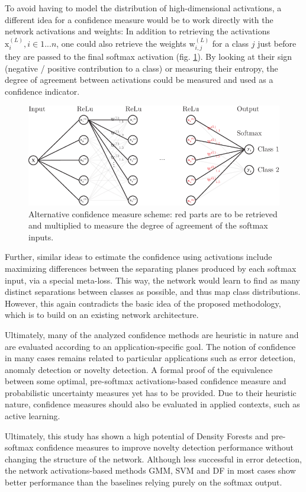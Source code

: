 \documentclass[10pt]{article}
\begin{document}
To avoid having to model the distribution of high-dimensional activations, a different idea for a confidence measure would be to work directly with the network activations and weights: In addition to retrieving the activations $\text{x}^{(L)}_i, i \in 1...n$, one could also retrieve the weights $\text{w}^{(L)}_{i, j}$ for a class $j$ just before they are passed to the final softmax activation (fig. \ref{fig:nn_scheme}). By looking at their sign (negative / positive contribution to a class) or measuring their entropy, the degree of agreement between activations could be measured and used as a confidence indicator.
\begin{figure}[H]
	\centering
	\includegraphics[width=.7\textwidth]{nn_scheme}
	\caption{Alternative confidence measure scheme: red parts are to be retrieved and multiplied to measure the degree of agreement of the softmax inputs.}
	\label{fig:nn_scheme}
\end{figure}

Further, similar ideas to estimate the confidence using activations include maximizing differences between the separating planes produced by each softmax input, via a special meta-loss. This way, the network would learn to find as many distinct separations between classes as possible, and thus map class distributions. However, this again contradicts the basic idea of the proposed methodology, which is to build on an existing network architecture.

Ultimately, many of the analyzed confidence methods are heuristic in nature and are evaluated according to an application-specific goal. The notion of confidence in many cases remains related to particular applications such as error detection, anomaly detection or novelty detection. A formal proof of the equivalence between some optimal, pre-softmax activations-based confidence measure and probabilistic uncertainty measures yet has to be provided. Due to their heuristic nature, confidence measures should also be evaluated in applied contexts, such as active learning.

Ultimately, this study has shown a high potential of Density Forests and pre-softmax confidence measures to improve novelty detection performance without changing the structure of the network. Although less successful in error detection, the network activations-based methods \gls{GMM}, SVM and \gls{DF} in most cases show better performance than the baselines relying purely on the softmax output. 
\end{document}
